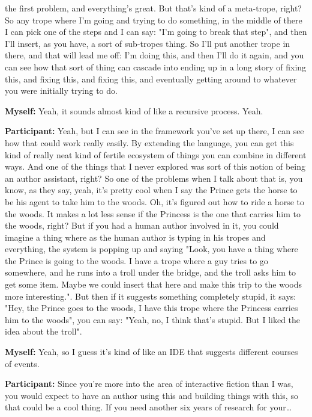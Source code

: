 \documentclass[11pt]{report}
\begin{document}
\begin{linenumbers}
the first problem, and everything's great. But that's kind of a meta-trope, right? So any trope where I'm going and trying to do something, in the middle of there I can pick one of the steps and I can say: "I'm going to break that step", and then I'll insert, as you have, a sort of sub-tropes thing. So I'll put another trope in there, and that will lead me off: I'm doing this, and then I'll do it again, and you can see how that sort of thing can cascade into ending up in a long story of fixing this, and fixing this, and fixing this, and eventually getting around to whatever you were initially trying to do.

\textbf{Myself:} Yeah, it sounds almost kind of like a recursive process. Yeah.

\textbf{Participant:} Yeah, but I can see in the framework you've set up there, I can see how that could work really easily. By extending the language, you can get this kind of really neat kind of fertile ecosystem of things you can combine in different ways. And one of the things that I never explored was sort of this notion of being an author assistant, right? So one of the problems when I talk about that is, you know, as they say, yeah, it's pretty cool when I say the Prince gets the horse to be his agent to take him to the woods. Oh, it's figured out how to ride a horse to the woods. It makes a lot less sense if the Princess is the one that carries him to the woods, right? But if you had a human author involved in it, you could imagine a thing where as the human author is typing in his tropes and everything, the system is popping up and saying "Look, you have a thing where the Prince is going to the woods. I have a trope where a guy tries to go somewhere, and he runs into a troll under the bridge, and the troll asks him to get some item. Maybe we could insert that here and make this trip to the woods more interesting.". But then if it suggests something completely stupid, it says: "Hey, the Prince goes to the woods, I have this trope where the Princess carries him to the woods", you can say: "Yeah, no, I think that's stupid. But I liked the idea about the troll".

\textbf{Myself:} Yeah, so I guess it's kind of like an IDE that suggests different courses of events.

\textbf{Participant:} Since you're more into the area of interactive fiction than I was, you would expect to have an author using this and building things with this, so that could be a cool thing. If you need another six years of research for your\ldots{}


\end{linenumbers}
\end{document}
